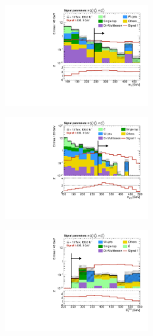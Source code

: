 \begin{figure}
	\centering
	\begin{subfigure}[b]{0.5\linewidth}
		\centering\includegraphics[width=0.7\textwidth]{N-1_cut_scan/n1_800_0/mt}
		\caption{}
	\end{subfigure}\hfill
	\begin{subfigure}[b]{0.5\linewidth}
		\centering\includegraphics[width=0.7\textwidth]{N-1_cut_scan/n1_800_0/mct}
		\caption{}
	\end{subfigure}\hfill
	\begin{subfigure}[b]{0.5\linewidth}
		\centering\includegraphics[width=0.7\textwidth]{N-1_cut_scan/n1_800_0/met}

\end{subfigure}
\end{figure}
